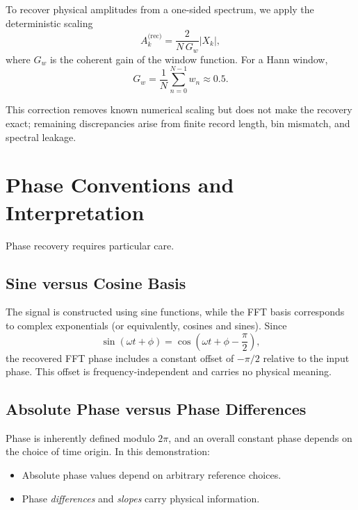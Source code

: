 \documentclass[11pt,a4paper]{article}
\begin{document}
To recover physical amplitudes from a one-sided spectrum, we apply the deterministic scaling
\begin{equation}
A_k^{\text{(rec)}} = \frac{2}{N\,G_w} |X_k|,
\end{equation}
where $G_w$ is the coherent gain of the window function.
For a Hann window,
\begin{equation}
G_w = \frac{1}{N} \sum_{n=0}^{N-1} w_n \approx 0.5.
\end{equation}

This correction removes known numerical scaling but does not make the recovery exact; remaining discrepancies arise from finite record length, bin mismatch, and spectral leakage.

\section{Phase Conventions and Interpretation}

Phase recovery requires particular care.

\subsection{Sine versus Cosine Basis}

The signal is constructed using sine functions, while the FFT basis corresponds to complex exponentials (or equivalently, cosines and sines).
Since
\begin{equation}
\sin(\omega t + \phi) = \cos\!\left(\omega t + \phi - \frac{\pi}{2}\right),
\end{equation}
the recovered FFT phase includes a constant offset of $-\pi/2$ relative to the input phase.
This offset is frequency-independent and carries no physical meaning.

\subsection{Absolute Phase versus Phase Differences}

Phase is inherently defined modulo $2\pi$, and an overall constant phase depends on the choice of time origin.
In this demonstration:
\begin{itemize}
  \item Absolute phase values depend on arbitrary reference choices.
  \item Phase \emph{differences} and \emph{slopes} carry physical information.
\end{itemize}
\end{document}
